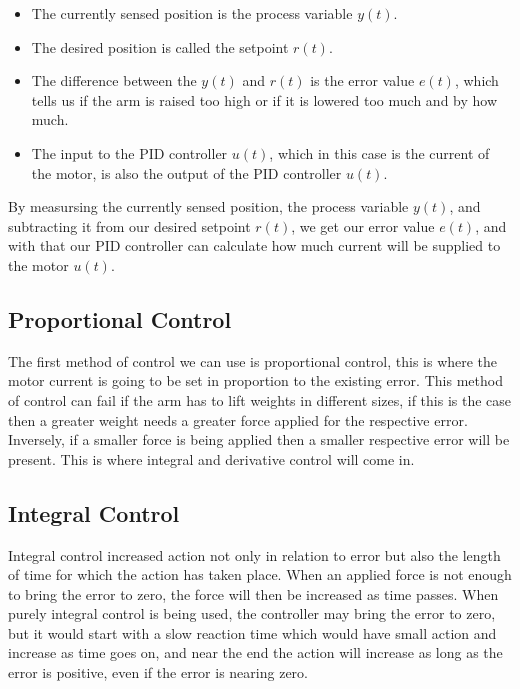 \documentclass[10pt,conference]{IEEEtran}
\begin{document}
\begin{itemize}
    \item The currently sensed position is the process variable \(y(t)\).
    \item The desired position is called the setpoint \(r(t)\).
    \item The difference between the \(y(t)\) and \(r(t)\) is the error value \(e(t)\), which
          tells us if the arm is raised too high or if it is lowered too much and by how much.
    \item The input to the PID controller \(u(t)\), which in this case is the current of the motor, is
          also the output of the PID controller \(u(t)\).
\end{itemize}

By measursing the currently sensed position, the process variable \(y(t)\), and subtracting it from
our desired setpoint \(r(t)\), we get our error value \(e(t)\), and with that our PID controller
can calculate how much current will be supplied to the motor \(u(t)\).

\subsection{Proportional Control}

The first method of control we can use is proportional control, this is where the motor current
is going to be set in proportion to the existing error. This method of control can fail if the
arm has to lift weights in different sizes, if this is the case then a greater weight needs a
greater force applied for the respective error. Inversely, if a smaller force is being applied
then a smaller respective error will be present. This is where integral and derivative control
will come in.

\subsection{Integral Control}

Integral control increased action not only in relation to error but also the length of time 
for which the action has taken place. When an applied force is not enough to bring the error 
to zero, the force will then be increased as time passes. When purely integral control is 
being used, the controller may bring the error to zero, but it would start with a slow 
reaction time which would have small action and increase as time goes on, and near the 
end the action will increase as long as the error is positive, even if the error is 
nearing zero.
\end{document}
